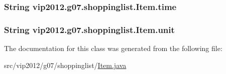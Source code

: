 \hypertarget{classvip2012_1_1g07_1_1shoppinglist_1_1Item_a4b3f6f3899f0211bf3e6532ed607b710}{
\subsubsection[{time}]{\setlength{\rightskip}{0pt plus 5cm}String vip2012.\-g07.\-shoppinglist.\-Item.\-time\hspace{0.3cm}{\ttfamily [private]}}}\label{classvip2012_1_1g07_1_1shoppinglist_1_1Item_a4b3f6f3899f0211bf3e6532ed607b710}
\hypertarget{classvip2012_1_1g07_1_1shoppinglist_1_1Item_a3d919fb6d4c95e347f5c00c12436948f}{
\subsubsection[{unit}]{\setlength{\rightskip}{0pt plus 5cm}String vip2012.\-g07.\-shoppinglist.\-Item.\-unit\hspace{0.3cm}{\ttfamily [private]}}}\label{classvip2012_1_1g07_1_1shoppinglist_1_1Item_a3d919fb6d4c95e347f5c00c12436948f}


The documentation for this class was generated from the following file\-:\begin{DoxyCompactItemize}
\item 
src/vip2012/g07/shoppinglist/\hyperlink{Item_8java}{Item.\-java}\end{DoxyCompactItemize}

